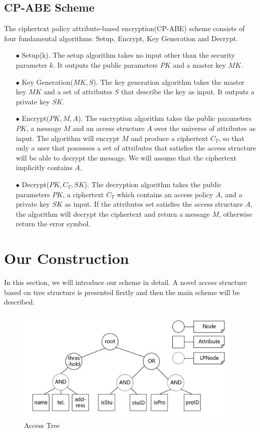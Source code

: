 \documentclass[smallextended]{svjour3}       %
\begin{document}
\subsection{CP-ABE Scheme}
The ciphertext policy attribute-based encryption(CP-ABE) scheme consists of four fundamental algorithms: Setup, Encrypt, Key Generation and Decrypt.
\begin{itemize}
	\item[$\bullet$]Setup(k). The setup algorithm takes no input other than the security parameter $k$. It outputs the public parameters $PK$ and a master key $MK$.
	\item[$\bullet$]Key Generation($MK,S$). The key generation algorithm takes the master key $MK$ and a set of attributes $S$ that describe the key as input. It outputs a private key $SK$.
	\item[$\bullet$]Encrypt($PK,M,A$). The encryption algorithm takes the public parameters $PK$, a message $M$ and an access structure $A$ over the universe of attributes as input. The algorithm will encrypt $M$ and produce a ciphertext $C_T$, so that only a user that possesses a set of attributes that satisfies the access structure will be able to decrypt the message. We will assume that the ciphertext implicitly contains $A$.
	\item[$\bullet$]Decrypt($PK,C_T,SK$). The decryption algorithm takes the public parameters $PK$, a ciphertext $C_T$ which contains an access policy $A$, and a private key $SK$ as input. If the attributes set satisfies the access structure $A$, the algorithm will decrypt the ciphertext and return a	message $M$, otherwise return the error symbol.
\end{itemize} 

\section{Our Construction}\label{section3}
In this section, we will introduce our scheme in detail. 
A novel access structure based on tree structure is presented firstly and then the main scheme will be described.

\begin{figure}
	\centering
	\includegraphics[width=4.3in, keepaspectratio]{figure}
	\caption{Access Tree}
	\label{figure1}
\end{figure}
\end{document}
